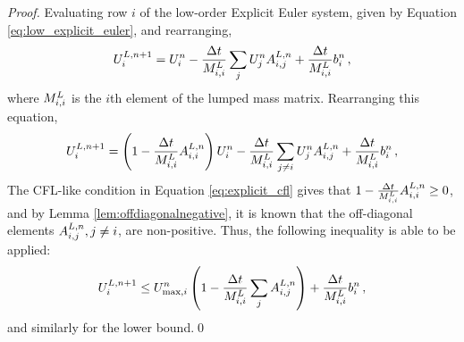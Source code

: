 \begin{proof}
Evaluating row $i$ of the low-order Explicit Euler system, given by Equation
\eqref{eq:low_explicit_euler}, and rearranging,
\[
   U_i^{L,n+1}
   = U_i^n
   - \frac{\Delta t}{M_{i,i}^L}
       \sum\limits_jU_j^n A^{L,n}_{i,j}
   + \frac{\Delta t}{M_{i,i}^L}b_i^n \,,
\]
where $M_{i,i}^L$ is the $i$th element of the lumped mass matrix.
Rearranging this equation,
\[
   U_i^{L,n+1}
   = \left(1-\frac{\Delta t}{M_{i,i}^L}
       A^{L,n}_{i,i}\right)U_i^n
   - \frac{\Delta t}{M_{i,i}^L}
       \sum\limits_{j\ne i}U_j^n A^{L,n}_{i,j}
   + \frac{\Delta t}{M_{i,i}^L}b_i^n \,,
\]
The CFL-like condition in Equation \eqref{eq:explicit_cfl} gives that
$1-\frac{\Delta t}{M_{i,i}^L}A^{L,n}_{i,i} \ge
0$, and by Lemma \ref{lem:offdiagonalnegative}, it is known that the
off-diagonal elements $A^{L,n}_{i,j}, j\ne i$, are non-positive.
Thus, the following inequality is able to be applied:
\[
   U_i^{L,n+1}
   \le U_{\max,i}^n
         \left(1-\frac{\Delta t}{M_{i,i}^L}
         \sum\limits_jA^{L,n}_{i,j}\right)
   + \frac{\Delta t}{M_{i,i}^L}b_i^n \,,
\]
and similarly for the lower bound.\qed
\end{proof}
